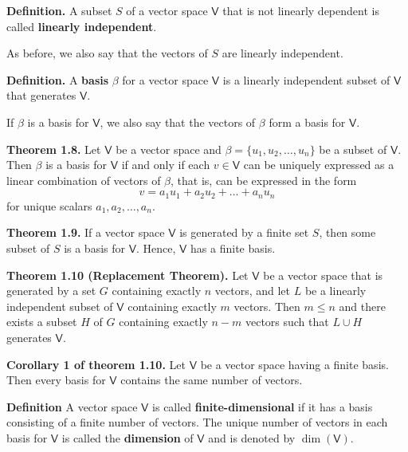 \documentclass{article}
\newcommand{\0}{\mathit{0}}
\begin{document}
\medskip

\textbf{Definition.}
A subset $S$ of a vector space $\mathsf{V}$ that is not linearly
dependent is called \textbf{linearly independent}.

As before, we also say that the vectors of $S$ are linearly independent.

\medskip

\textbf{Definition.}
A \textbf{basis} $\beta$ for a vector space $\mathsf{V}$ is a linearly independent
subset of $\mathsf{V}$ that generates $\mathsf{V}$.

If $\beta$ is a basis for $\mathsf{V}$, we also say that the vectors of
$\beta$ form a basis for $\mathsf{V}$.

\medskip

\textbf{Theorem 1.8.} Let $\mathsf{V}$ be a vector space and
$\beta = \{ u_1, u_2, \dots, u_n \}$ be a subset of $\mathsf{V}$.
Then $\beta$ is a basis for $\mathsf{V}$ if and only if each
$v \in \mathsf{V}$ can be uniquely expressed as a linear
combination of vectors of $\beta$, that is, can be expressed in the form
\[
    v = a_1 u_1 + a_2 u_2 + \dots + a_n u_n
\]
for unique scalars $a_1, a_2, \dots, a_n$.

\medskip

\textbf{Theorem 1.9.} If a vector space $\mathsf{V}$ is generated by a finite
set $S$, then some subset of $S$ is a basis for $\mathsf{V}$.
Hence, $\mathsf{V}$ has a finite basis.

\medskip

\textbf{Theorem 1.10 (Replacement Theorem).}
Let $\mathsf{V}$ be a vector space that is generated by a set $G$ containing
exactly $n$ vectors, and let $L$ be a linearly independent subset of
$\mathsf{V}$ containing exactly $m$ vectors. Then $m \leq n$ and there
exists a subset $H$ of $G$ containing exactly $n - m$ vectors such that
$L \cup H$ generates $\mathsf{V}$.

\medskip

\textbf{Corollary 1 of theorem 1.10.} Let $\mathsf{V}$ be a vector space having a finite basis.
Then every basis for $\mathsf{V}$ contains the same number of vectors.

\medskip

\textbf{Definition}
A vector space $\mathsf{V}$ is called \textbf{finite-dimensional} if it has a basis
consisting of a finite number of vectors. The unique number of vectors in each
basis for $\mathsf{V}$ is called the \textbf{dimension} of $\mathsf{V}$ and is denoted
by $\dim(\mathsf{V})$.
\end{document}
